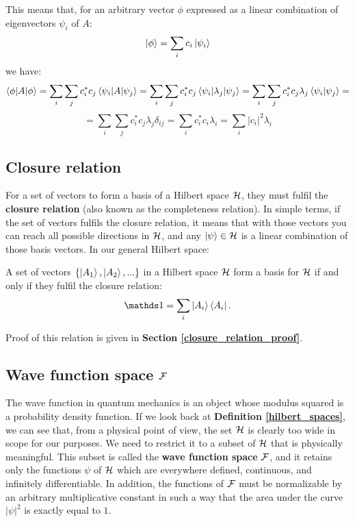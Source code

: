 This means that, for an arbitrary vector $\phi$ expressed as a linear combination of eigenvectors $\psi_i$ of $A$:
\begin{equation}
    \ket{\phi} = \sum_i c_i\ket{\psi_i}
\end{equation}
we have:
\begin{equation*}
    \braket{\phi|A|\phi} = \sum_i\sum_j c_i^*c_j\braket{\psi_i|A|\psi_j} = \sum_i\sum_j c_i^*c_j\braket{\psi_i|\lambda_j|\psi_j} = \sum_i\sum_j c_i^*c_j\lambda_j\braket{\psi_i|\psi_j} = 
\end{equation*}
\begin{equation} \label{expected_value}
    = \sum_i\sum_j c_i^*c_j\lambda_j\delta_{ij} = \sum_i c_i^*c_i\lambda_i = \sum_i |c_i|^2\lambda_i
\end{equation}

\subsection{Closure relation}

For a set of vectors to form a basis of a Hilbert space $\mathcal{H}$, they must fulfil the \textbf{closure relation} (also known as the completeness relation). In simple terms, if the set of vectors fulfils the closure relation, it means that with those vectors you can reach all possible directions in $\mathcal{H}$, and any $\ket{\psi}\in\mathcal{H}$ is a linear combination of those basis vectors. In our general Hilbert space:

\begin{definition}
    A set of vectors $\{\ket{A_1}, \ket{A_2}, ...\}$ in a Hilbert space $\mathcal{H}$ form a basis for $\mathcal{H}$ if and only if they fulfil the closure relation:
    \begin{equation}
        \Imat = \sum_i\ket{A_i} \bra{A_i}.
    \end{equation}
\end{definition}

Proof of this relation is given in \textbf{Section \ref{closure_relation_proof}}.

\subsection{Wave function space $\mathcal{F}$}

The wave function in quantum mechanics is an object whose modulus squared is a probability density function. If we look back at \textbf{Definition \ref{hilbert_spaces}}, we can see that, from a physical point of view, the set $\mathcal{H}$ is clearly too wide in scope for our purposes. We need to restrict it to a subset of $\mathcal{H}$ that is physically meaningful. This subset is called the \textbf{wave function space} $\mathcal{F}$, and it retains only the functions $\psi$ of $\mathcal{H}$ which are everywhere defined, continuous, and infinitely differentiable. In addition, the functions of $\mathcal{F}$ must be normalizable by an arbitrary multiplicative constant in such a way that the area under the curve $|\psi|^2$ is exactly equal to $1$.

